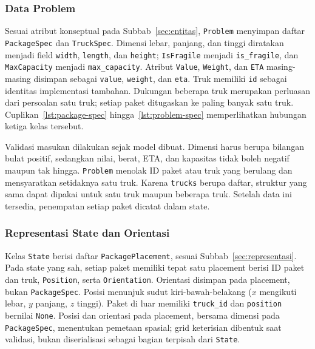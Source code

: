 \documentclass[12pt,a4paper]{article}
\begin{document}
\subsubsection{Data Problem}
Sesuai atribut konseptual pada Subbab~\ref{sec:entitas}, \texttt{Problem} menyimpan daftar \texttt{PackageSpec} dan \texttt{TruckSpec}. Dimensi lebar, panjang, dan tinggi diratakan menjadi field \texttt{width}, \texttt{length}, dan \texttt{height}; \texttt{IsFragile} menjadi \texttt{is\_fragile}, dan \texttt{MaxCapacity} menjadi \texttt{max\_capacity}. Atribut \texttt{Value}, \texttt{Weight}, dan \texttt{ETA} masing-masing disimpan sebagai \texttt{value}, \texttt{weight}, dan \texttt{eta}. Truk memiliki \texttt{id} sebagai identitas implementasi tambahan. Dukungan beberapa truk merupakan perluasan dari persoalan satu truk; setiap paket ditugaskan ke paling banyak satu truk. Cuplikan~\ref{lst:package-spec} hingga~\ref{lst:problem-spec} memperlihatkan hubungan ketiga kelas tersebut.





Validasi masukan dilakukan sejak model dibuat. Dimensi harus berupa bilangan bulat positif, sedangkan nilai, berat, ETA, dan kapasitas tidak boleh negatif maupun tak hingga. \texttt{Problem} menolak ID paket atau truk yang berulang dan mensyaratkan setidaknya satu truk. Karena \texttt{trucks} berupa daftar, struktur yang sama dapat dipakai untuk satu truk maupun beberapa truk. Setelah data ini tersedia, penempatan setiap paket dicatat dalam state.

\subsubsection{Representasi State dan Orientasi}
Kelas \texttt{State} berisi daftar \texttt{PackagePlacement}, sesuai Subbab~\ref{sec:representasi}. Pada state yang sah, setiap paket memiliki tepat satu placement berisi ID paket dan truk, \texttt{Position}, serta \texttt{Orientation}. Orientasi disimpan pada placement, bukan \texttt{PackageSpec}. Posisi menunjuk sudut kiri-bawah-belakang ($x$ mengikuti lebar, $y$ panjang, $z$ tinggi). Paket di luar memiliki \texttt{truck\_id} dan \texttt{position} bernilai \texttt{None}. Posisi dan orientasi pada placement, bersama dimensi pada \texttt{PackageSpec}, menentukan pemetaan spasial; grid keterisian dibentuk saat validasi, bukan diserialisasi sebagai bagian terpisah dari \texttt{State}.
\end{document}
